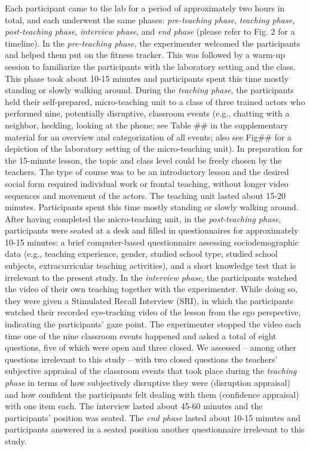 \documentclass[preprint, 3p,
authoryear]{elsarticle} %
\begin{document}
Each participant came to the lab for a period of approximately two hours
in total, and each underwent the same phases: \emph{pre-teaching phase},
\emph{teaching phase}, \emph{post-teaching phase}, \emph{interview
phase}, and \emph{end phase} (please refer to Fig. 2 for a timeline). In
the \emph{pre-teaching phase}, the experimenter welcomed the
participants and helped them put on the fitness tracker. This was
followed by a warm-up session to familiarize the participants with the
laboratory setting and the class. This phase took about 10-15 minutes
and participants spent this time mostly standing or slowly walking
around. During the \emph{teaching phase}, the participants held their
self-prepared, micro-teaching unit to a class of three trained actors
who performed nine, potentially disruptive, classroom events (e.g.,
chatting with a neighbor, heckling, looking at the phone; see Table \#\#
in the supplementary material for an overview and categorization of all
events; also see Fig\#\# for a depiction of the laboratory setting of
the micro-teaching unit). In preparation for the 15-minute lesson, the
topic and class level could be freely chosen by the teachers. The type
of course was to be an introductory lesson and the desired social form
required individual work or frontal teaching, without longer video
sequences and movement of the actors. The teaching unit lasted about
15-20 minutes. Participants spent this time mostly standing or slowly
walking around. After having completed the micro-teaching unit, in the
\emph{post-teaching phase}, participants were seated at a desk and
filled in questionnaires for approximately 10-15 minutes: a brief
computer-based questionnaire assessing sociodemographic data (e.g.,
teaching experience, gender, studied school type, studied school
subjects, extracurricular teaching activities), and a short knowledge
test that is irrelevant to the present study. In the \emph{interview
phase}, the participants watched the video of their own teaching
together with the experimenter. While doing so, they were given a
Stimulated Recall Interview (SRI), in which the participants watched
their recorded eye-tracking video of the lesson from the ego
perspective, indicating the participants' gaze point. The experimenter
stopped the video each time one of the nine classroom events happened
and asked a total of eight questions, five of which were open and three
closed. We assessed -- among other questions irrelevant to this study --
with two closed questions the teachers' subjective appraisal of the
classroom events that took place during the \emph{teaching phase} in
terms of how subjectively disruptive they were (disruption appraisal)
and how confident the participants felt dealing with them (confidence
appraisal) with one item each. The interview lasted about 45-60 minutes
and the participants' position was seated. The \emph{end phase} lasted
about 10-15 minutes and participants answered in a seated position
another questionnaire irrelevant to this study.
\end{document}
